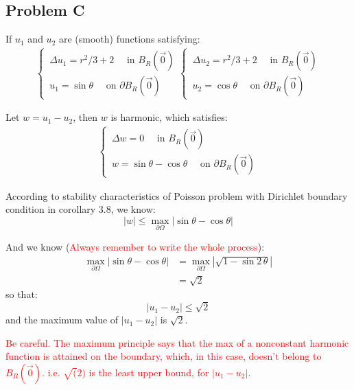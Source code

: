 \documentclass[../main.tex]{subfiles}
\begin{document}
\subsection{Problem C}

If $u_1$ and $u_2$ are (smooth) functions satisfying:
\begin{align}
    \begin{cases}
        \, \Delta u_1 = r^2 / 3 + 2 \quad \text{ in  } B_R(\vec{0}) \\
        \, u_1 = \sin{\theta} \quad \text{ on  } \partial B_R(\vec{0})
    \end{cases}
    \begin{cases}
        \, \Delta u_2 = r^2 / 3 + 2 \quad \text{ in  } B_R(\vec{0}) \\
        \, u_2 = \cos{\theta} \quad \text{ on  } \partial B_R(\vec{0})
    \end{cases}
\end{align}

Let $w = u_1 - u_2$, then $w$ is harmonic, which satisfies:
\begin{align}
    \begin{cases}
        \, \Delta w = 0 \quad \text{ in  } B_R(\vec{0}) \\
        \, w = \sin{\theta} - \cos{\theta} \quad \text{ on  } \partial B_R(\vec{0})
    \end{cases}
\end{align}

According to stability characteristics of Poisson problem with Dirichlet boundary condition in corollary 3.8, we know:
\begin{equation}
    |w| \leqslant \max_{\partial \Omega} |\sin{\theta} - \cos{\theta}|
\end{equation}

And we know (\textcolor{red}{Always remember to write the whole process}):
\begin{align}
    \max_{\partial \Omega} |\sin{\theta} - \cos{\theta}| &= \max_{\partial \Omega} |\sqrt{1 - \sin{2 \, \theta}}| \\
    &= \sqrt{2} \nonumber
\end{align}
so that:
\begin{equation}
    |u_1 - u_2| \leqslant \sqrt{2}
\end{equation}
and the maximum value of $|u_1 - u_2|$ is $\sqrt{2}$.

\textcolor{red}{Be careful. The maximum principle says that the max of a nonconstant harmonic function is attained on the boundary, which, in this case, doesn't belong to $B_R(\vec{0})$. i.e. $\sqrt(2)$ is the least upper bound, for $|u_1 - u_2|$.}
\end{document}

